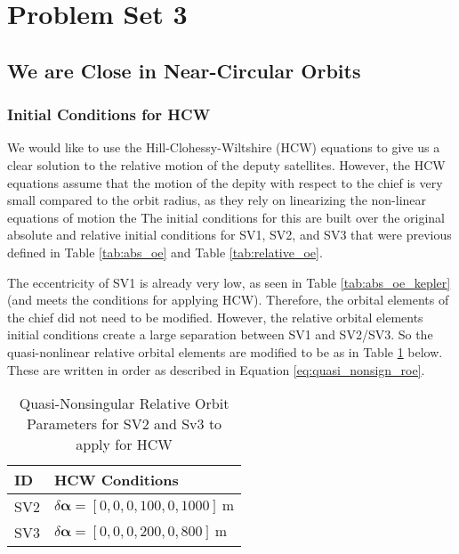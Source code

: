 \section{Problem Set 3}
\subsection{We are Close in Near-Circular Orbits}

\subsubsection{Initial Conditions for HCW}

We would like to use the Hill-Clohessy-Wiltshire (HCW) equations to give us a clear solution to the relative motion of the deputy satellites. However, the HCW equations assume that the motion of the depity with respect to the chief is very small compared to the orbit radius, as they rely on linearizing the non-linear equations of motion the The initial conditions for this are built over the original absolute and relative initial conditions for SV1, SV2, and SV3 that were previous defined in Table \ref{tab:abs_oe} and Table \ref{tab:relative_oe}.

The eccentricity of SV1 is already very low, as seen in Table \ref{tab:abs_oe_kepler} (and meets the conditions for applying HCW). Therefore, the orbital elements of the chief did not need to be modified. However, the relative orbital elements initial conditions create a large separation between SV1 and SV2/SV3. So the quasi-nonlinear relative orbital elements are modified to be as in Table \ref{tab:relative_oe_hcw} below. These are written in order as described in Equation \ref{eq:quasi_nonsign_roe}.

\begin{table}[h!]
\centering
\begin{tabular}{ll}
\toprule
\textbf{ID} & \textbf{HCW Conditions} \\
\midrule
SV2 & $\delta\boldsymbol{\alpha} = [0, 0, 0, 100, 0, 1000]~\text{m}$ \\
SV3 & $\delta\boldsymbol{\alpha} = [0, 0, 0, 200, 0, 800]~\text{m}$ \\
\bottomrule
\end{tabular}
\caption{Quasi-Nonsingular Relative Orbit Parameters for SV2 and Sv3 to apply for HCW}
\label{tab:relative_oe_hcw}
\end{table}

